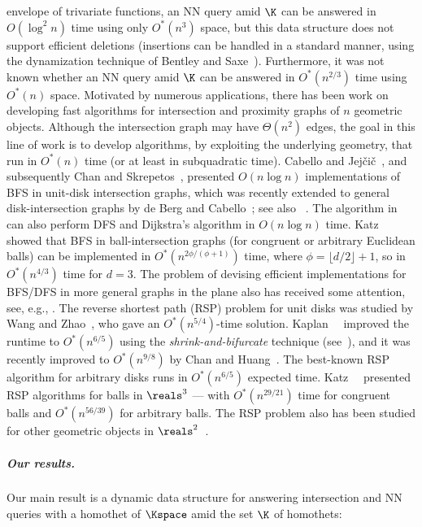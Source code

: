 envelope of trivariate functions, an NN query amid $\K$ can be answered in $O(\log^2 n)$ time 
using only $O^*(n^3)$ space, but this data structure does not support efficient deletions 
(insertions can be handled in a standard manner, using the dynamization technique 
of Bentley and Saxe~\cite{BS80}). Furthermore, it was not known whether an NN query 
amid $\K$ can be answered in $O^*(n^{2/3})$ time using $O^*(n)$ space.
%
Motivated by numerous applications, there has been work on developing fast algorithms 
for intersection and proximity graphs of $n$ geometric objects. Although the intersection 
graph may have $\Theta(n^2)$ edges, the goal in this line of work is to develop algorithms, 
by exploiting the underlying geometry, that run in $O^*(n)$ time (or at least in subquadratic time).
Cabello and Jej\v{c}i\v{c}~\cite{CabelloJ15}, and subsequently Chan and Skrepetos~\cite{CS}, presented
$O(n \log n)$ implementations of BFS in unit-disk intersection graphs, which was recently 
extended to general disk-intersection graphs by de Berg and Cabello~\cite{BergC25}; 
see also ~\cite{KKSS,KMRSS,Klost23}. The algorithm in~\cite{BergC25} can also perform DFS 
and Dijkstra's algorithm in $O(n\log n)$ time.
Katz~\etal~\cite{KSS} showed that BFS in ball-intersection graphs (for congruent or 
arbitrary Euclidean balls)
can be implemented in $O^*(n^{2\phi/(\phi+1)})$ time, where $\phi = \lfloor d/2 \rfloor + 1$, 
so in $O^*(n^{4/3})$ time for $d=3$. The problem of devising efficient implementations for BFS/DFS 
in more general graphs in the plane also has received some attention, 
see, e.g., \cite{AgarwalKKS24,AgarwalKS24,KSS24}.  
%
The reverse shortest path (RSP) problem for unit disks was studied by 
Wang and Zhao~\cite{WZ}, who gave an $O^*(n^{5/4})$-time solution. 
Kaplan~\etal~\cite{KKSS} improved the runtime to $O^*(n^{6/5})$ using the 
\emph{shrink-and-bifurcate} technique (see~\cite{BFKKS}), and it was recently improved to $O^*(n^{9/8})$ by
Chan and Huang~\cite{CH}. The best-known RSP algorithm for arbitrary disks runs in $O^*(n^{6/5})$ expected time.
Katz~\etal~\cite{KSS} presented RSP algorithms for balls in $\reals^3$ --- with 
$O^*(n^{29/21})$ time for congruent balls and $O^*(n^{56/39})$ for arbitrary balls.  
The RSP problem also has been studied for other geometric objects in 
$\reals^2$~\cite{AgarwalKS24,KSS,CH}.  
%
\ifsocgproc 
\subparagraph*{Our results.} 
Our main result is a dynamic data structure for answering intersection 
and NN queries with a homothet of $\Kspace$ amid the set $\K$ of homothets:
\else
